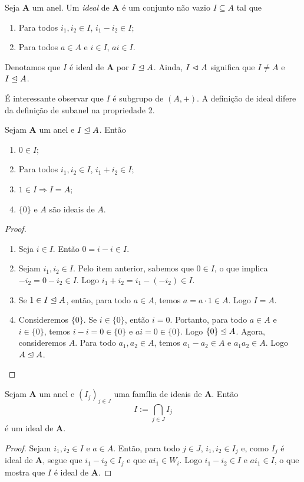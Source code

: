 \begin{definition}
Seja $\bm A$ um anel. Um \emph{ideal} de $\bm A$ é um conjunto não vazio $I \subseteq A$ tal que
	\begin{enumerate}
	\item Para todos $i_1,i_2 \in I$, $i_1 - i_2 \in I$;
	\item Para todos $a \in A$ e $i \in I$, $ai \in I$.
	\end{enumerate}
Denotamos que $I$ é ideal de $\bm A$ por $I \mathrel{\unlhd} A$. Ainda, $I \mathrel{\lhd} A$ significa que $I \neq A$ e $I \mathrel{\unlhd} A$.
\end{definition}

É interessante observar que $I$ é subgrupo de $(A,+)$. A definição de ideal difere da definição de subanel na propriedade 2.

\begin{proposition}
Sejam $\bm A$ um anel e $I \mathrel{\unlhd} A$. Então
	\begin{enumerate}
	\item $0 \in I$;
	\item Para todos $i_1,i_2 \in I$, $i_1 + i_2 \in I$;
	\item $1 \in I \Rightarrow I=A$;
	\item $\{0\}$ e $A$ são ideais de $A$.
	\end{enumerate}
\end{proposition}
\begin{proof}
	\begin{enumerate}
	\item Seja $i \in I$. Então $0 = i-i \in I$.
	\item Sejam $i_1,i_2 \in I$. Pelo item anterior, sabemos que $0 \in I$, o que implica $-i_2 = 0 - i_2 \in I$. Logo $i_1 + i_2 = i_1 - (-i_2) \in I$.
	\item Se $1 \in I \mathrel{\unlhd} A$, então, para todo $a \in A$, temos $a=a\cdot1 \in A$. Logo $I=A$.
	\item Consideremos $\{0\}$. Se $i \in \{0\}$, então $i=0$. Portanto, para todo $a \in A$ e $i \in \{0\}$, temos $i-i=0 \in \{0\}$ e $ai=0 \in \{0\}$. Logo $\{0\} \mathrel{\unlhd} A$. Agora, consideremos $A$. Para todo $a_1,a_2 \in A$, temos $a_1-a_2 \in A$ e $a_1a_2 \in A$. Logo $A \mathrel{\unlhd} A$.
	\end{enumerate}
\end{proof}

\begin{proposition}
Sejam $\bm A$ um anel e $(I_j)_{j \in J}$ uma família de ideais de $\bm A$. Então
	\begin{equation*}
	I := \bigcap_{j \in J} I_j
	\end{equation*}
é um ideal de $\bm A$.
\end{proposition}
\begin{proof}
	Sejam $i_1,i_2 \in I$ e $a \in A$. Então, para todo $j \in J$, $i_1,i_2 \in I_j$ e, como $I_j$ é ideal de $\bm A$, segue que $i_1-i_2 \in I_j$ e que $ai_1 \in W_i$. Logo $i_1-i_2 \in I$ e $ai_1 \in I$, o que mostra que $I$ é ideal de $\bm A$.
\end{proof}

